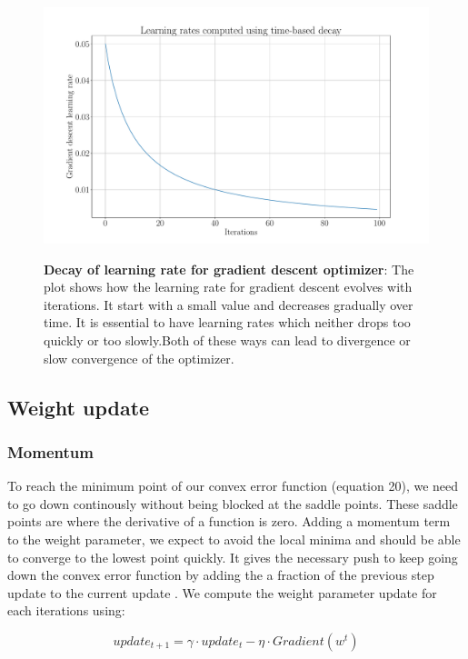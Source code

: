 \begin{figure}[h]
\begin{centering}
    {\includegraphics[scale=0.35]{figures/Learning_rates.pdf}}
    \caption[Decay of learning rate for gradient descent optimizer]{\textbf{Decay of learning rate for gradient descent optimizer}: The plot shows how the learning rate for gradient descent evolves with iterations. It start with a small value and decreases gradually over time. It is essential to have learning rates which neither drops too quickly or too slowly.Both of these ways can lead to divergence or slow convergence of the optimizer.}
\end{centering}
\end{figure}

\subsection{Weight update}
\subsubsection{Momentum}
To reach the minimum point of our convex error function (equation 20), we need to go down continously without being blocked at the saddle points. These saddle points are where the derivative of a function is zero. Adding a momentum term to the weight parameter, we expect to avoid the local minima and should be able to converge to the lowest point quickly. It gives the necessary push to keep going down the convex error function by adding the a fraction of the previous step update to the current update \cite{articleRuderS, Sutskever}. We compute the weight parameter update for each iterations using:

\begin{equation}
update_{t+1} = \gamma \cdot update_{t} - \eta \cdot Gradient(w^t)
\end{equation}

